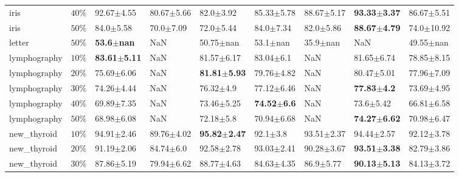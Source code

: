 \begin{tabular}{lllllllll}
         iris &     $ 40\% $ &          92.67$\pm$4.55 &  80.67$\pm$5.66 &           82.0$\pm$3.92 &          85.33$\pm$5.78 &          88.67$\pm$5.17 & \textbf{93.33$\pm$3.37} &          86.67$\pm$5.51 \\
         iris &     $ 50\% $ &           84.0$\pm$5.58 &   70.0$\pm$7.09 &           72.0$\pm$5.44 &           84.0$\pm$7.34 &           82.0$\pm$5.86 & \textbf{88.67$\pm$4.79} &          74.0$\pm$10.92 \\
       letter &     $ 50\% $ &   \textbf{53.6$\pm$nan} &             NaN &           50.75$\pm$nan &            53.1$\pm$nan &            35.9$\pm$nan &                     NaN &           49.55$\pm$nan \\
 lymphography &     $ 10\% $ & \textbf{83.61$\pm$5.11} &             NaN &          81.57$\pm$6.17 &           83.04$\pm$6.1 &                     NaN &          81.65$\pm$6.74 &          78.85$\pm$8.15 \\
 lymphography &     $ 20\% $ &          75.69$\pm$6.06 &             NaN & \textbf{81.81$\pm$5.93} &          79.76$\pm$4.82 &                     NaN &          80.47$\pm$5.01 &          77.96$\pm$7.09 \\
 lymphography &     $ 30\% $ &          74.26$\pm$4.44 &             NaN &           76.32$\pm$4.9 &          77.12$\pm$6.46 &                     NaN &  \textbf{77.83$\pm$4.2} &          73.69$\pm$4.95 \\
 lymphography &     $ 40\% $ &          69.89$\pm$7.35 &             NaN &          73.46$\pm$5.25 &  \textbf{74.52$\pm$6.6} &                     NaN &           73.6$\pm$5.42 &          66.81$\pm$6.58 \\
 lymphography &     $ 50\% $ &          68.98$\pm$6.08 &             NaN &           72.18$\pm$5.8 &          70.94$\pm$6.68 &                     NaN & \textbf{74.27$\pm$6.62} &          70.98$\pm$6.47 \\
  new_thyroid &     $ 10\% $ &          94.91$\pm$2.46 &  89.76$\pm$4.02 & \textbf{95.82$\pm$2.47} &            92.1$\pm$3.8 &          93.51$\pm$2.37 &          94.44$\pm$2.57 &          92.12$\pm$3.78 \\
  new_thyroid &     $ 20\% $ &          91.19$\pm$2.06 &   84.74$\pm$6.0 &          92.58$\pm$2.78 &          93.03$\pm$2.41 &          90.28$\pm$3.67 & \textbf{93.51$\pm$3.38} &          82.79$\pm$3.86 \\
  new_thyroid &     $ 30\% $ &          87.86$\pm$5.19 &  79.94$\pm$6.62 &          88.77$\pm$4.63 &          84.63$\pm$4.35 &           86.9$\pm$5.77 & \textbf{90.13$\pm$5.13} &          84.13$\pm$3.72 \\

\end{tabular}
